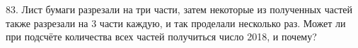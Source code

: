 83. Лист бумаги разрезали на три части, затем некоторые из полученных частей также разрезали на 3 части каждую, и так проделали несколько раз. Может ли при подсчёте количества всех частей получиться число 2018, и почему?\\
